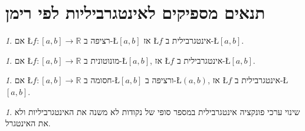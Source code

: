 \documentclass[english,hebrew]{article}
\theoremstyle{remark}
\theoremstyle{definition}
\theoremstyle{plain}
\theoremstyle{remark}
\newtheorem{claim}[thm]{\protect\claimname}
\theoremstyle{plain}
\theoremstyle{plain}
\providecommand{\claimname}{טענה}
\begin{document}
\part{תנאים מספיקים לאינטגרביליות לפי רימן}
\begin{claim}
\label{claim:continuous-integrable}אם \L{$f:\left[a,b\right]\rightarrow\mathbb{R}$}
רציפה ב-\L{$\left[a,b\right]$} אז \L{$f$} אינטגרבילית ב-\L{$\left[a,b\right]$}.
\end{claim}

\begin{claim}
אם \L{$f:\left[a,b\right]\rightarrow\mathbb{R}$} מונוטונית ב-\L{$\left[a,b\right]$},
אז \L{$f$} אינטגרבילית ב-\L{$\left[a,b\right]$}.
\end{claim}

\begin{claim}
אם \L{$f:\left[a,b\right]\rightarrow\mathbb{R}$} חסומה ב-\L{$\left[a,b\right]$}
ורציפה ב-\L{$\left(a,b\right)$}, אז \L{$f$} אינטגרבילית ב-\L{$\left[a,b\right]$}.
\end{claim}

\begin{claim}
שינוי ערכי פונקציה אינטגרבילית במספר סופי של נקודות לא משנה את האינטגרביליות
ולא את האינטגרל.
\end{claim}
\end{document}
